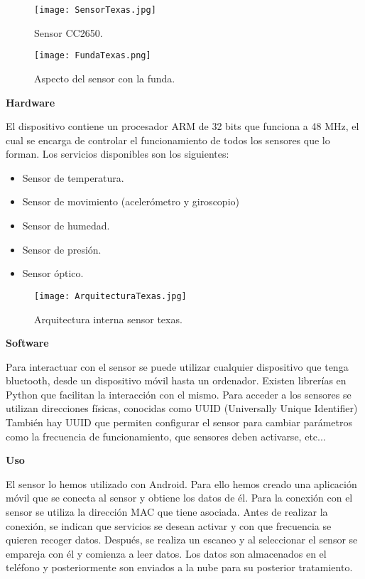 \documentclass[11pt,spanish]{article}
\begin{document}
\begin{figure}[h!]
  \centering
  \texttt{[image: SensorTexas.jpg]}
  \caption{Sensor CC2650.}
\end{figure}

\begin{figure}[h!]
  \centering
  \texttt{[image: FundaTexas.png]}
  \caption{Aspecto del sensor con la funda.}
\end{figure}

{\bf Hardware}
\newline

El dispositivo contiene un procesador ARM de 32 bits que funciona a 48 MHz, el cual se encarga de controlar el funcionamiento de todos los sensores que lo forman. Los servicios disponibles son los siguientes:

\begin{itemize}
  \item Sensor de temperatura.
  \item Sensor de movimiento (acelerómetro y giroscopio)
  \item Sensor de humedad.
  \item Sensor de presión.
  \item Sensor óptico.
\end{itemize}

\begin{figure}[h!]
  \centering
  \texttt{[image: ArquitecturaTexas.jpg]}
  \caption{Arquitectura interna sensor texas.}
\end{figure}

{\bf Software}
\newline

Para interactuar con el sensor se puede utilizar cualquier dispositivo que tenga bluetooth, desde un dispositivo móvil hasta un ordenador. Existen librerías en Python que facilitan la interacción con el mismo. Para acceder a los sensores se utilizan direcciones físicas, conocidas como UUID (Universally Unique Identifier) También hay UUID que permiten configurar el sensor para cambiar parámetros como la frecuencia de funcionamiento, que sensores deben activarse, etc...
\newline

{\bf Uso}
\newline

El sensor lo hemos utilizado con Android. Para ello hemos creado una aplicación móvil que se conecta al sensor y obtiene los datos de él. Para la conexión con el sensor se utiliza la dirección MAC que tiene asociada. Antes de realizar la conexión, se indican que servicios se desean activar y con que frecuencia se quieren recoger datos. Después, se realiza un escaneo y al seleccionar el sensor se empareja con él y comienza a leer datos. Los datos son almacenados en el teléfono y posteriormente son enviados a la nube para su posterior tratamiento.
\end{document}
